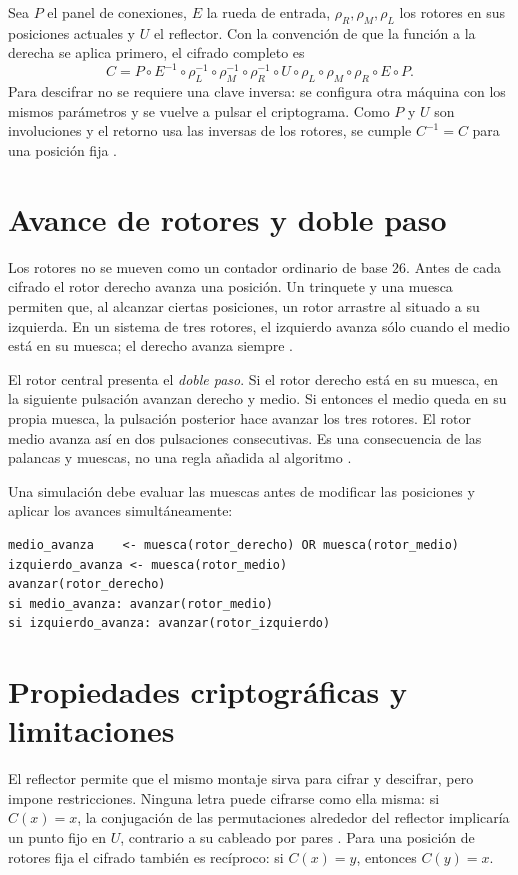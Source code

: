 \documentclass[letterpaper,12pt]{article}
\begin{document}
Sea $P$ el panel de conexiones, $E$ la rueda de entrada, $\rho_R,\rho_M,\rho_L$ los rotores en sus posiciones actuales y $U$ el reflector. Con la convención de que la función a la derecha se aplica primero, el cifrado completo es
\[
C=P\circ E^{-1}\circ\rho_L^{-1}\circ\rho_M^{-1}\circ\rho_R^{-1}\circ U
  \circ\rho_L\circ\rho_M\circ\rho_R\circ E\circ P.
\]
Para descifrar no se requiere una clave inversa: se configura otra máquina con los mismos parámetros y se vuelve a pulsar el criptograma. Como $P$ y $U$ son involuciones y el retorno usa las inversas de los rotores, se cumple $C^{-1}=C$ para una posición fija \cite{friedman-enigma}.

\section{Avance de rotores y doble paso}
Los rotores no se mueven como un contador ordinario de base 26. Antes de cada cifrado el rotor derecho avanza una posición. Un trinquete y una muesca permiten que, al alcanzar ciertas posiciones, un rotor arrastre al situado a su izquierda. En un sistema de tres rotores, el izquierdo avanza sólo cuando el medio está en su muesca; el derecho avanza siempre \cite{hamer-double}.

El rotor central presenta el \emph{doble paso}. Si el rotor derecho está en su muesca, en la siguiente pulsación avanzan derecho y medio. Si entonces el medio queda en su propia muesca, la pulsación posterior hace avanzar los tres rotores. El rotor medio avanza así en dos pulsaciones consecutivas. Es una consecuencia de las palancas y muescas, no una regla añadida al algoritmo \cite{hamer-double}.

Una simulación debe evaluar las muescas antes de modificar las posiciones y aplicar los avances simultáneamente:
\begin{lstlisting}[language={},caption={Actualización previa al cifrado.},label={lst:avance}]
medio_avanza    <- muesca(rotor_derecho) OR muesca(rotor_medio)
izquierdo_avanza <- muesca(rotor_medio)
avanzar(rotor_derecho)
si medio_avanza: avanzar(rotor_medio)
si izquierdo_avanza: avanzar(rotor_izquierdo)
\end{lstlisting}

\section{Propiedades criptográficas y limitaciones}
El reflector permite que el mismo montaje sirva para cifrar y descifrar, pero impone restricciones. Ninguna letra puede cifrarse como ella misma: si $C(x)=x$, la conjugación de las permutaciones alrededor del reflector implicaría un punto fijo en $U$, contrario a su cableado por pares \cite{friedman-lectures}. Para una posición de rotores fija el cifrado también es recíproco: si $C(x)=y$, entonces $C(y)=x$.
\end{document}
